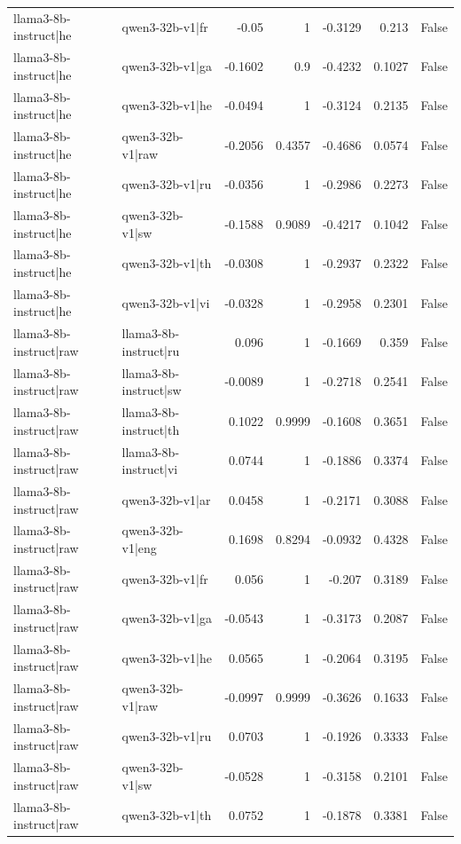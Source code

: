 \begin{table}
\begin{tabular}{l l r r r r l}
llama3-8b-instruct|he & qwen3-32b-v1|fr & -0.05 & 1 & -0.3129 & 0.213 & False \\
llama3-8b-instruct|he & qwen3-32b-v1|ga & -0.1602 & 0.9 & -0.4232 & 0.1027 & False \\
llama3-8b-instruct|he & qwen3-32b-v1|he & -0.0494 & 1 & -0.3124 & 0.2135 & False \\
llama3-8b-instruct|he & qwen3-32b-v1|raw & -0.2056 & 0.4357 & -0.4686 & 0.0574 & False \\
llama3-8b-instruct|he & qwen3-32b-v1|ru & -0.0356 & 1 & -0.2986 & 0.2273 & False \\
llama3-8b-instruct|he & qwen3-32b-v1|sw & -0.1588 & 0.9089 & -0.4217 & 0.1042 & False \\
llama3-8b-instruct|he & qwen3-32b-v1|th & -0.0308 & 1 & -0.2937 & 0.2322 & False \\
llama3-8b-instruct|he & qwen3-32b-v1|vi & -0.0328 & 1 & -0.2958 & 0.2301 & False \\
llama3-8b-instruct|raw & llama3-8b-instruct|ru & 0.096 & 1 & -0.1669 & 0.359 & False \\
llama3-8b-instruct|raw & llama3-8b-instruct|sw & -0.0089 & 1 & -0.2718 & 0.2541 & False \\
llama3-8b-instruct|raw & llama3-8b-instruct|th & 0.1022 & 0.9999 & -0.1608 & 0.3651 & False \\
llama3-8b-instruct|raw & llama3-8b-instruct|vi & 0.0744 & 1 & -0.1886 & 0.3374 & False \\
llama3-8b-instruct|raw & qwen3-32b-v1|ar & 0.0458 & 1 & -0.2171 & 0.3088 & False \\
llama3-8b-instruct|raw & qwen3-32b-v1|eng & 0.1698 & 0.8294 & -0.0932 & 0.4328 & False \\
llama3-8b-instruct|raw & qwen3-32b-v1|fr & 0.056 & 1 & -0.207 & 0.3189 & False \\
llama3-8b-instruct|raw & qwen3-32b-v1|ga & -0.0543 & 1 & -0.3173 & 0.2087 & False \\
llama3-8b-instruct|raw & qwen3-32b-v1|he & 0.0565 & 1 & -0.2064 & 0.3195 & False \\
llama3-8b-instruct|raw & qwen3-32b-v1|raw & -0.0997 & 0.9999 & -0.3626 & 0.1633 & False \\
llama3-8b-instruct|raw & qwen3-32b-v1|ru & 0.0703 & 1 & -0.1926 & 0.3333 & False \\
llama3-8b-instruct|raw & qwen3-32b-v1|sw & -0.0528 & 1 & -0.3158 & 0.2101 & False \\
llama3-8b-instruct|raw & qwen3-32b-v1|th & 0.0752 & 1 & -0.1878 & 0.3381 & False \\

\end{tabular}
\end{table}
